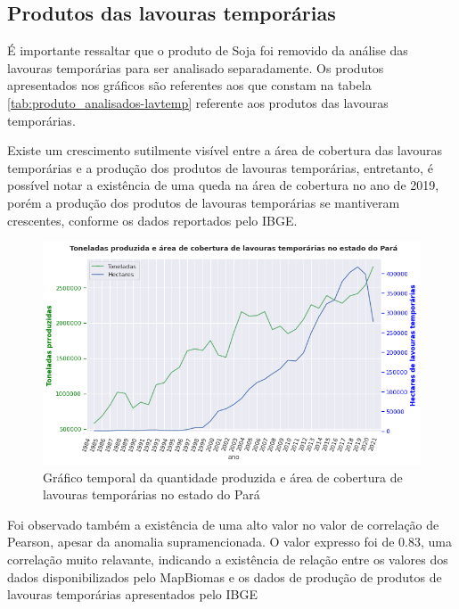 
\subsection{Produtos das lavouras temporárias}

É importante ressaltar que o produto de Soja foi removido da análise das lavouras temporárias para ser analisado separadamente. Os produtos apresentados nos gráficos são referentes aos que constam na tabela \ref{tab:produto_analisados-lavtemp} referente aos produtos das lavouras temporárias.

Existe um crescimento sutilmente visível entre a área de cobertura das lavouras temporárias e a produção dos produtos de lavouras temporárias, entretanto, é possível notar a existência de uma queda na área de cobertura no ano de 2019, porém a produção dos produtos de lavouras temporárias se mantiveram crescentes, conforme os dados reportados pelo IBGE.

\begin{figure}[hbt!]
    \centering
    \includegraphics[width=0.7\columnwidth]{src/plots/plot-lavouras_temp.png}
    \centering
    \caption{Gráfico temporal da quantidade produzida e área de cobertura de lavouras temporárias no estado do Pará}
    \label{fig:cobertura_pastagem-numero_cabeca}
\end{figure}

Foi observado também a existência de uma alto valor no valor de correlação de Pearson, apesar da anomalia supramencionada. O valor expresso foi de 0.83, uma correlação muito relavante, indicando a existência de relação entre os valores dos dados disponibilizados pelo MapBiomas e os dados de produção de produtos de lavouras temporárias apresentados pelo IBGE

